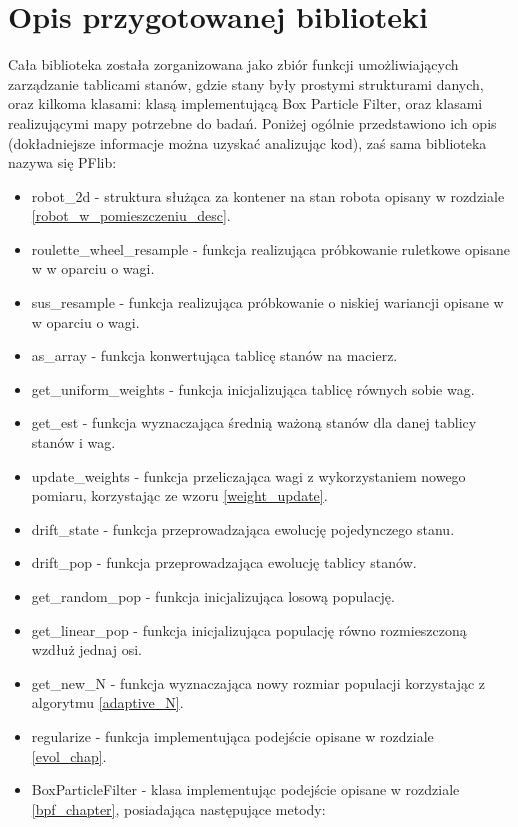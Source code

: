 \section{Opis przygotowanej biblioteki}
Cała biblioteka została zorganizowana jako zbiór funkcji umożliwiających zarządzanie tablicami stanów, gdzie stany były prostymi strukturami danych, oraz kilkoma klasami: klasą implementującą Box Particle Filter, oraz klasami realizującymi mapy potrzebne do badań. Poniżej ogólnie przedstawiono ich opis (dokładniejsze informacje można uzyskać analizując kod), zaś sama biblioteka nazywa się PFlib:
\begin{itemize}
	\item robot\_2d - struktura służąca za kontener na stan robota opisany w rozdziale \ref{robot_w_pomieszczeniu_desc}.
	\item roulette\_wheel\_resample - funkcja realizująca próbkowanie ruletkowe opisane w \cite{rou_wiki} w oparciu o wagi.
	\item sus\_resample - funkcja realizująca próbkowanie o niskiej wariancji opisane w \cite{sus_wiki} w oparciu o wagi.
	\item as\_array - funkcja konwertująca tablicę stanów na macierz.
	\item get\_uniform\_weights - funkcja inicjalizująca tablicę równych sobie wag.
	\item get\_est - funkcja wyznaczająca średnią ważoną stanów dla danej tablicy stanów i wag.
	\item update\_weights - funkcja przeliczająca wagi z wykorzystaniem nowego pomiaru, korzystając ze wzoru \ref{weight_update}.
	\item drift\_state - funkcja przeprowadzająca ewolucję pojedynczego stanu.
	\item drift\_pop - funkcja przeprowadzająca ewolucję tablicy stanów.
	\item get\_random\_pop - funkcja inicjalizująca losową populację.
	\item get\_linear\_pop - funkcja inicjalizująca populację równo rozmieszczoną wzdłuż jednaj osi.
	\item get\_new\_N - funkcja wyznaczająca nowy rozmiar populacji korzystając z algorytmu \ref{adaptive_N}.
	\item regularize - funkcja implementująca podejście opisane w rozdziale \ref{evol_chap}.
	\item BoxParticleFilter - klasa implementując podejście opisane w rozdziale \ref{bpf_chapter}, posiadająca następujące metody:
	\begin{itemize}

\end{itemize}
\end{itemize}
